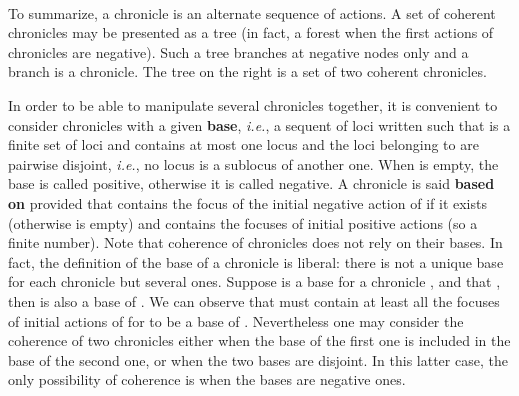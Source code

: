 \documentclass{LMCS}
\def\ie{{\em i.e.}}
\begin{document}
 
\begin{exa}~\\
\begin{minipage}{.66\textwidth}
To summarize, a chronicle is an alternate sequence of actions. A set of coherent chronicles may be presented as a tree (in fact, a forest when the first actions of chronicles are negative). Such a tree branches at negative nodes only and a branch is a chronicle. The tree on the right is a set of two coherent chronicles.
\end{minipage}
\begin{minipage}{.3\textwidth}
\end{minipage}
\end{exa}

In order to be able to manipulate several chronicles together, it is convenient to consider chronicles with a given {\bf base}, \ie, a sequent of loci written  such that  is a finite set of  loci and  contains at most one locus and the loci belonging to  are pairwise disjoint, \ie, no locus is a sublocus of another one. When  is empty, the base is called positive, otherwise it is called negative.
A chronicle  is said {\bf based on}  provided that  contains the focus of the initial negative action of  if it exists (otherwise  is empty) and   contains the focuses of initial positive actions (so a finite number).
Note that coherence of chronicles does not rely on their bases. In fact,  the definition of the base of a chronicle is liberal: there is not a unique base for each chronicle but several ones. Suppose  is a base for a chronicle , and that , then  is also a base of .
We can observe that  must contain at least all the focuses of initial actions of  for  to be a base of . 
Nevertheless one may consider the coherence of two chronicles either when the base of the first one is included in the base of the second one, or when the two bases are disjoint. In this latter case, the only possibility of coherence is when the bases are negative ones.

 
\end{document}
